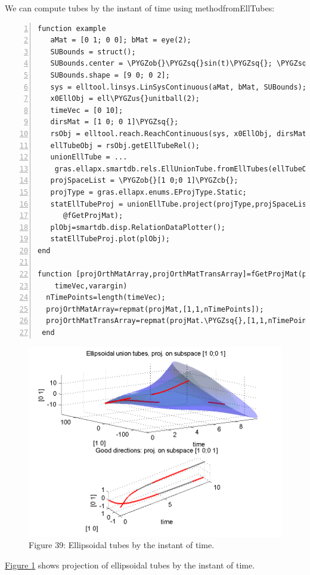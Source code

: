 \documentclass[letterpaper,10pt,english]{sphinxmanual}
\def\PYGZus{\char`\_}
\def\PYGZob{\char`\{}
\def\PYGZcb{\char`\}}
\def\PYGZsq{\char`\'}
\begin{document}
We can compute tubes by the instant of time using methodfromEllTubes:

\begin{Verbatim}[commandchars=\\\{\},numbers=left,firstnumber=1,stepnumber=1]
function example
   aMat = [0 1; 0 0]; bMat = eye(2);  
   SUBounds = struct();
   SUBounds.center = \PYGZob{}\PYGZsq{}sin(t)\PYGZsq{}; \PYGZsq{}cos(t)\PYGZsq{}\PYGZcb{};  
   SUBounds.shape = [9 0; 0 2]; 
   sys = elltool.linsys.LinSysContinuous(aMat, bMat, SUBounds);
   x0EllObj = ell\PYGZus{}unitball(2);
   timeVec = [0 10]; 
   dirsMat = [1 0; 0 1]\PYGZsq{};  
   rsObj = elltool.reach.ReachContinuous(sys, x0EllObj, dirsMat, timeVec);
   ellTubeObj = rsObj.getEllTubeRel();
   unionEllTube = ...
    gras.ellapx.smartdb.rels.EllUnionTube.fromEllTubes(ellTubeObj);
   projSpaceList = \PYGZob{}[1 0;0 1]\PYGZcb{};
   projType = gras.ellapx.enums.EProjType.Static;
   statEllTubeProj = unionEllTube.project(projType,projSpaceList,...
      @fGetProjMat);
   plObj=smartdb.disp.RelationDataPlotter();
   statEllTubeProj.plot(plObj);
end

function [projOrthMatArray,projOrthMatTransArray]=fGetProjMat(projMat,...
    timeVec,varargin)
  nTimePoints=length(timeVec);
  projOrthMatArray=repmat(projMat,[1,1,nTimePoints]);
  projOrthMatTransArray=repmat(projMat.\PYGZsq{},[1,1,nTimePoints]);
 end
\end{Verbatim}
\begin{figure}[htbp]
\centering
\capstart

\includegraphics[width=0.700\linewidth]{chapter05_section03_unionTubeStatProj.png}
\caption{Figure 39: Ellipsoidal tubes by the instant of time.}\label{chap_implement:uniontubestatproj}\end{figure}

\hyperref[chap_implement:uniontubestatproj]{Figure  \ref*{chap_implement:uniontubestatproj}} shows projection of ellipsoidal
tubes by the instant of time.
\end{document}
